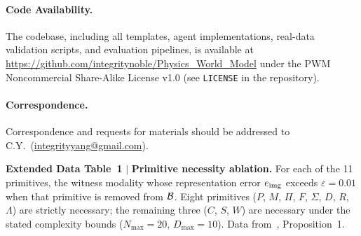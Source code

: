 \paragraph{Code Availability.}
The \pwm{} codebase, including all \opg{} templates, agent implementations, real-data validation scripts, and evaluation pipelines, is available at \url{https://github.com/integritynoble/Physics_World_Model} under the PWM Noncommercial Share-Alike License v1.0 (see \texttt{LICENSE} in the repository).

\paragraph{Correspondence.}
Correspondence and requests for materials should be addressed to C.Y.\ (\url{integrityyang@gmail.com}).









\clearpage
\noindent\textbf{Extended Data Table~1} $|$ \textbf{Primitive necessity ablation.} For each of the 11 primitives, the witness modality whose representation error $e_{\mathrm{img}}$ exceeds $\varepsilon = 0.01$ when that primitive is removed from $\mathcal{B}$. Eight primitives ($P$, $M$, $\Pi$, $F$, $\Sigma$, $D$, $R$, $\Lambda$) are strictly necessary; the remaining three ($C$, $S$, $W$) are necessary under the stated complexity bounds ($N_{\max} = 20$, $D_{\max} = 10$). Data from~\cite{yang2026fpt}, Proposition~1.

